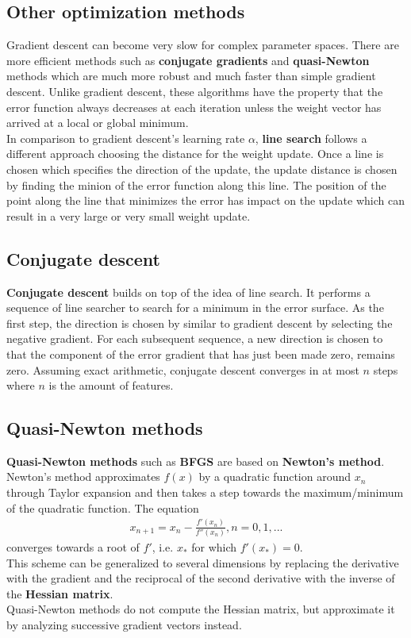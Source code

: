 \documentclass{report}
\begin{document}
\subsection{Other optimization methods}
Gradient descent can become very slow for complex parameter spaces.
There are more efficient methods such as {\bf conjugate gradients} and {\bf quasi-Newton} methods which are much more robust and much faster than simple gradient descent.
Unlike gradient descent, these algorithms have the property that the error function always decreases at each iteration unless the weight vector has arrived at a local or global minimum. \\
In comparison to gradient descent's learning rate $\alpha$, {\bf line search} follows a different approach choosing the distance for the weight update.
Once a line is chosen which specifies the direction of the update, the update distance is chosen by finding the minion of the error function along this line.
The position of the point along the line that minimizes the error has impact on the update which can result in a very large or very small weight update.

\subsection{Conjugate descent}
{\bf Conjugate descent} builds on top of the idea of line search. It performs a sequence of line searcher to search for a minimum in the error surface.
As the first step, the direction is chosen by similar to gradient descent by selecting the negative gradient.
For each subsequent sequence, a new direction is chosen to that the component of the error gradient that has just been made zero, remains zero.
Assuming exact arithmetic, conjugate descent converges in at most $n$ steps where $n$ is the amount of features.


\subsection{Quasi-Newton methods}
{\bf Quasi-Newton methods} such as {\bf BFGS} are based on {\bf Newton's method}.
Newton's method approximates $f(x)$ by a quadratic function around $x_n$ through Taylor expansion and then takes a step towards the maximum/minimum of the quadratic function.
The equation
\begin{align*}
x_{n+1} = x_n - \frac{f'(x_n)}{f''(x_n)}, n = 0, 1, ...
\end{align*}
converges towards a root of $f'$, i.e. $x_*$ for which $f'(x_*)=0$. \\
This scheme can be generalized to several dimensions by replacing the derivative with the gradient and the reciprocal of the second derivative with the inverse of the {\bf Hessian matrix}. \\
Quasi-Newton methods do not compute the Hessian matrix, but approximate it by analyzing successive gradient vectors instead.
\end{document}
